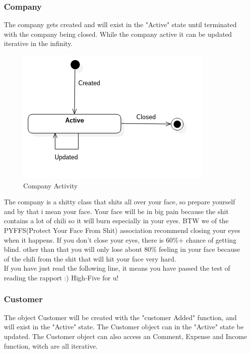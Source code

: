 \subsubsection*{Company}

The company gets created and will exist in the "Active" state until terminated with the company being closed.
While the company active it can be updated iterative in the infinity.

\begin{figure}[H]
    \centering
    \includegraphics[scale=0.6]{Images/ProblemDomain/companyActivityDiagram.png}
    \caption{Company Activity}
    \label{fig:companyActivityDiagram}
\end{figure}

The company is a shitty class that shits all over your face, so prepare yourself and by that i mean your face. Your face will be in big pain because the shit contains a lot of chili so it will burn especially in your eyes. BTW we of the PYFFS(Protect Your Face From Shit) association recommend closing your eyes when it happens. If you don't close your eyes, there is 60\%+ chance of getting blind. other than that you will only lose about 80\% feeling in your face because of the chili from the shit that will hit your face very hard. \\
If you have just read the following line, it means you have passed the test of reading the rapport :) High-Five for u!


\subsubsection*{Customer}

The object Customer will be created with the "customer Added" function, and will exist in the "Active" state. The Customer object can in the "Active" state be updated. The Customer object can also access an Comment, Expense and Income function, witch are all iterative.

